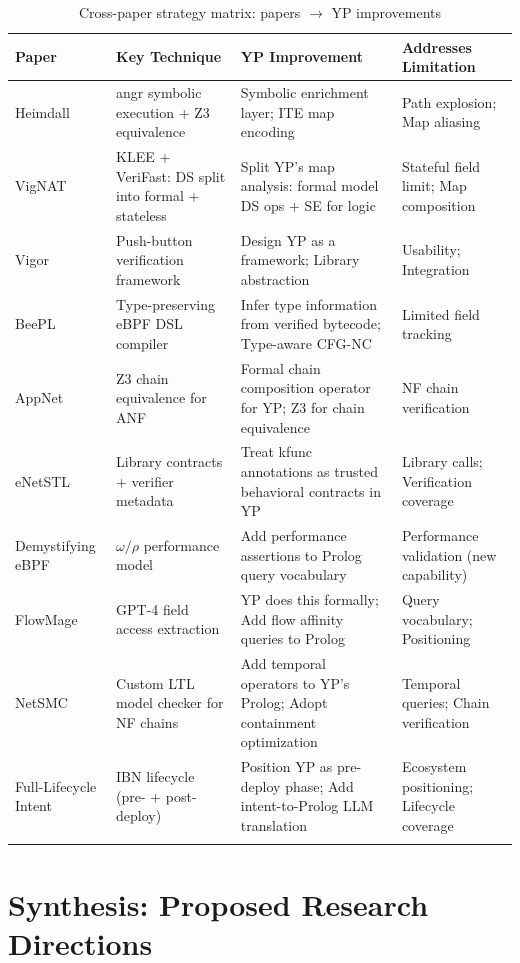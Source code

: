\documentclass[12pt, a4paper]{article}
\begin{document}
\begin{longtable}{p{3.5cm} p{4cm} p{4cm} p{3cm}}
\toprule
\textbf{Paper} & \textbf{Key Technique} & \textbf{YP Improvement} & \textbf{Addresses Limitation} \\
\midrule
\endhead
Heimdall & angr symbolic execution + Z3 equivalence & Symbolic enrichment layer; ITE map encoding & Path explosion; Map aliasing \\
\midrule
VigNAT & KLEE + VeriFast: DS split into formal + stateless & Split YP's map analysis: formal model DS ops + SE for logic & Stateful field limit; Map composition \\
\midrule
Vigor & Push-button verification framework & Design YP as a framework; Library abstraction & Usability; Integration \\
\midrule
BeePL & Type-preserving eBPF DSL compiler & Infer type information from verified bytecode; Type-aware CFG-NC & Limited field tracking \\
\midrule
AppNet & Z3 chain equivalence for ANF & Formal chain composition operator for YP; Z3 for chain equivalence & NF chain verification \\
\midrule
eNetSTL & Library contracts + verifier metadata & Treat kfunc annotations as trusted behavioral contracts in YP & Library calls; Verification coverage \\
\midrule
Demystifying eBPF & $\omega/\rho$ performance model & Add performance assertions to Prolog query vocabulary & Performance validation (new capability) \\
\midrule
FlowMage & GPT-4 field access extraction & YP does this formally; Add flow affinity queries to Prolog & Query vocabulary; Positioning \\
\midrule
NetSMC & Custom LTL model checker for NF chains & Add temporal operators to YP's Prolog; Adopt containment optimization & Temporal queries; Chain verification \\
\midrule
Full-Lifecycle Intent & IBN lifecycle (pre- + post-deploy) & Position YP as pre-deploy phase; Add intent-to-Prolog LLM translation & Ecosystem positioning; Lifecycle coverage \\
\bottomrule
\caption{Cross-paper strategy matrix: papers $\to$ YP improvements}
\label{tab:strategy-matrix}
\end{longtable}

\section{Synthesis: Proposed Research Directions}
\label{sec:synthesis}
\end{document}
